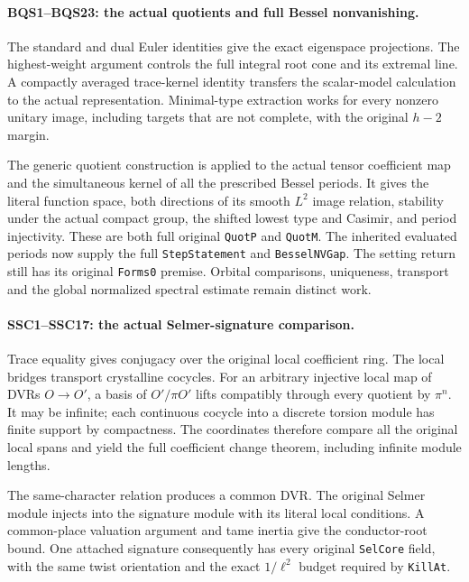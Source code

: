 \documentclass[11pt,a4paper]{article}
\numberwithin{equation}{section}
\theoremstyle{remark}\newtheorem{remark}[theorem]{Remark}
\begin{document}
\paragraph{BQS1--BQS23: the actual quotients and full Bessel nonvanishing.}
The standard and dual Euler identities give the exact eigenspace
projections. The highest-weight argument controls the full integral
root cone and its extremal line. A compactly averaged trace-kernel
identity transfers the scalar-model calculation to the actual
representation. Minimal-type extraction works for every nonzero
unitary image, including targets that are not complete, with the
original $h-2$ margin.

The generic quotient construction is applied to the actual tensor
coefficient map and the simultaneous kernel of all the prescribed
Bessel periods. It gives the literal function space, both directions
of its smooth $L^2$ image relation, stability under the actual compact
group, the shifted lowest type and Casimir, and period injectivity.
These are both full original \texttt{Quot\allowbreak P} and \texttt{Quot\allowbreak M}.
The inherited evaluated periods now supply the full
\texttt{Step\allowbreak Statement} and \texttt{Bessel\allowbreak NVGap}.
The setting return still has its original \texttt{Forms0}
premise. Orbital comparisons, uniqueness, transport and the global
normalized spectral estimate remain distinct work.

\paragraph{SSC1--SSC17: the actual Selmer-signature comparison.}
Trace equality gives conjugacy over the original local coefficient
ring. The local bridges transport crystalline cocycles. For an
arbitrary injective local map of DVRs $O\to O'$, a basis of
$O'/\pi O'$ lifts compatibly through every quotient by $\pi^n$.
It may be infinite; each continuous cocycle into a discrete torsion
module has finite support by compactness. The coordinates therefore
compare all the original local spans and yield the full coefficient
change theorem, including infinite module lengths.

The same-character relation produces a common DVR. The original
Selmer module injects into the signature module with its literal
local conditions. A common-place valuation argument and tame inertia
give the conductor-root bound. One attached signature consequently
has every original \texttt{Sel\allowbreak Core} field, with the same twist
orientation and the exact $1/\ell^2$ budget required by
\texttt{Kill\allowbreak At}.
\end{document}
